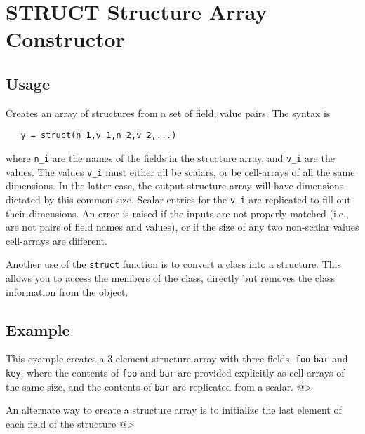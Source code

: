 \section{STRUCT Structure Array Constructor}

\subsection{Usage}

Creates an array of structures from a set of field, value pairs.
The syntax is
\begin{verbatim}
   y = struct(n_1,v_1,n_2,v_2,...)
\end{verbatim}
where \verb|n_i| are the names of the fields in the structure array, and
\verb|v_i| are the values.  The values \verb|v_i| must either all be
scalars, or be cell-arrays of all the same dimensions.  In the latter 
case, the
output structure array will have dimensions dictated by this common
size.  Scalar entries for the \verb|v_i| are replicated to fill out
their dimensions. An error is raised if the inputs are not properly matched (i.e., are
not pairs of field names and values), or if the size of any two non-scalar
values cell-arrays are different.

Another use of the \verb|struct| function is to convert a class into a 
structure.  This allows you to access the members of the class, directly 
but removes the class information from the object.

\subsection{Example}

This example creates a 3-element structure array with three fields, \verb|foo|
\verb|bar| and \verb|key|, where the contents of \verb|foo| and \verb|bar| are provided 
explicitly as cell arrays of the same size, and the contents of \verb|bar| 
are replicated from a scalar.
@>

An alternate way to create a structure array is to initialize the last
element of each field of the structure
@>
